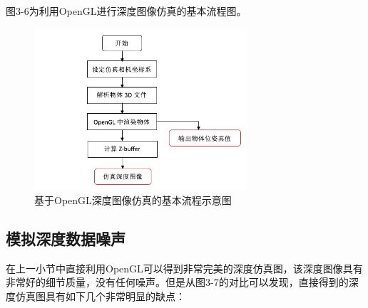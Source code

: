 图3-6为利用OpenGL进行深度图像仿真的基本流程图。
\begin{figure}[htb]
	\centering 
	\includegraphics[width=0.7\textwidth]{./mypic/基于OpenGL深度图像仿真的基本流程示意图.jpg} 
	\caption{基于OpenGL深度图像仿真的基本流程示意图} 
\end{figure}





\subsection{模拟深度数据噪声} %
在上一小节中直接利用OpenGL可以得到非常完美的深度仿真图，该深度图像具有非常好的细节质量，没有任何噪声。但是从图3-7的对比可以发现，直接得到的深度仿真图具有如下几个非常明显的缺点：

